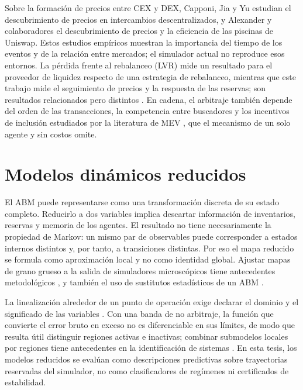 Sobre la formación de precios entre CEX y DEX, Capponi, Jia y Yu \cite{capponi2026price} estudian el descubrimiento de precios en intercambios descentralizados, y Alexander y colaboradores \cite{alexander2025price} el descubrimiento de precios y la eficiencia de las piscinas de Uniswap. Estos estudios empíricos muestran la importancia del tiempo de los eventos y de la relación entre mercados; el simulador actual no reproduce esos entornos. La pérdida frente al rebalanceo (LVR) mide un resultado para el proveedor de liquidez respecto de una estrategia de rebalanceo, mientras que este trabajo mide el seguimiento de precios y la respuesta de las reservas; son resultados relacionados pero distintos \cite{milionis2022lvr,milionis2022quantifying}. En cadena, el arbitraje también depende del orden de las transacciones, la competencia entre buscadores y los incentivos de inclusión estudiados por la literatura de MEV \cite{daian2020flash,zhou2021hft}, que el mecanismo de un solo agente y sin costos omite.

\section{Modelos dinámicos reducidos}

El ABM puede representarse como una transformación discreta de su estado completo. Reducirlo a dos variables implica descartar información de inventarios, reservas y memoria de los agentes. El resultado no tiene necesariamente la propiedad de Markov: un mismo par de observables puede corresponder a estados internos distintos y, por tanto, a transiciones distintas. Por eso el mapa reducido se formula como aproximación local y no como identidad global. Ajustar mapas de grano grueso a la salida de simuladores microscópicos tiene antecedentes metodológicos \cite{gear2003equationfree}, y también el uso de sustitutos estadísticos de un ABM \cite{lamperti2018surrogates}.

La linealización alrededor de un punto de operación exige declarar el dominio y el significado de las variables \cite{roubal2010linearization}. Con una banda de no arbitraje, la función que convierte el error bruto en exceso no es diferenciable en sus límites, de modo que resulta útil distinguir regiones activas e inactivas; combinar submodelos locales por regiones tiene antecedentes en la identificación de sistemas \cite{takagi1985fuzzy}. En esta tesis, los modelos reducidos se evalúan como descripciones predictivas sobre trayectorias reservadas del simulador, no como clasificadores de regímenes ni certificados de estabilidad.

